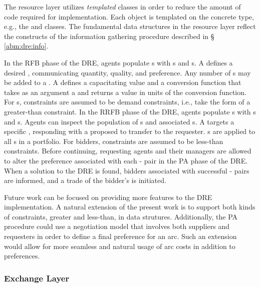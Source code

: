The resource layer utilizes \textit{templated} classes in order to reduce the
amount of code required for implementation. Each object is templated on the
concrete  type, e.g., the  and 
classes. The fundamental data structures in the resource layer reflect the
constructs of the information gathering procedure described in \S
\ref{abm:dre:info}.

In the RFB phase of the DRE, agents populate s with
s and s. A 
defines a desired , communicating quantity, quality, and
preference. Any number of s may be added to a
. A  defines a
capacitating value and a conversion function that takes as an argument a
 and returns a value in units of the conversion function. For
s, constraints are assumed to be demand
constraints, i.e., take the form of a greater-than constraint. In the RRFB phase
of the DRE, agents populate s with s and
s. Agents can inspect the population of
s and associated s. A  targets a
specific , responding with a proposed  to
transfer to the requester. s are applied to all
s in a portfolio. For bidders, constraints are assumed to be
less-than constraints. Before continuing, requesting agents and their managers
are allowed to alter the preference associated with each
- pair in the PA phase of the DRE. When a solution
to the DRE is found, bidders associated with successful
- pairs are informed, and a trade of the bidder's
 is initiated.

Future work can be focused on providing more features to the DRE
implementation. A natural extension of the present work is to support both kinds
of constraints, greater and less-than, in  data
strutures. Additionally, the PA procedure could use a negotiation model that
involves both suppliers and requesters in order to define a final preference for
an arc. Such an extension would allow for more seamless and natural usage of arc
costs in addition to preferences.

\subsubsection{Exchange Layer} 

